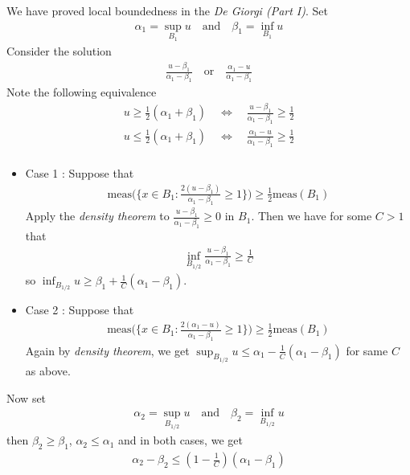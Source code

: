 \documentclass[12pt,a4paper]{article}
\newenvironment{proof}
{\begin{changemargin}{0.5cm}{0.5cm} 
	}%
	{\end{changemargin}
}
\newenvironment{p}
{\begin{proof} 
	}%
	{\end{proof}
}
\begin{document}
\begin{p}
\pf We have proved local boundedness in the \emph{De Giorgi (Part I)}. Set
\begin{align*}
\alpha_1 = \sup_{B_1}u \quad \text{and} \quad \beta_1 = \inf_{B_1} u
\end{align*}
Consider the solution
\begin{align*}
\frac{u-\beta_1}{\alpha_1 - \beta_1} \quad \text{or} \quad \frac{\alpha_1-u}{\alpha_1 -\beta_1}
\end{align*}
Note the following equivalence
\begin{align*}
u\geq \frac{1}{2}(\alpha_1 + \beta_1) \quad \Leftrightarrow \quad \frac{u-\beta_1}{\alpha_1 -\beta_1} \geq \frac{1}{2} \\
u\leq \frac{1}{2}(\alpha_1 + \beta_1) \quad \Leftrightarrow \quad \frac{\alpha_1-u}{\alpha_1 -\beta_1} \geq \frac{1}{2} \\
\end{align*}
\begin{itemize}
\item Case 1 : Suppose that
\begin{align*}
\text{meas}\Big(\Big\{ x\in B_1 : \frac{2(u-\beta_1)}{\alpha_1 -\beta_1} \geq 1 \Big\} \Big) \geq\frac{1}{2}\text{meas}(B_1)
\end{align*}
Apply the \emph{density theorem} to $\frac{u- \beta_1}{\alpha_1 -\beta_1} \geq 0$ in $B_1$. Then we have for some $C>1$ that
\begin{align*}
\inf_{B_{1/2}}\frac{u-\beta_1}{\alpha_1 -\beta_1} \geq \frac{1}{C}
\end{align*}
so $\inf_{B_{1/2}} u \geq \beta_1 + \frac{1}{C}(\alpha_1-\beta_1)$.
\item Case 2 : Suppose that
\begin{align*}
\text{meas}\Big(\Big\{ x\in B_1 : \frac{2(\alpha_1 -u)}{\alpha_1 -\beta_1} \geq 1 \Big\} \Big) \geq\frac{1}{2}\text{meas}(B_1)
\end{align*}
Again by \emph{density theorem}, we get $\sup_{B_{1/2}} u\leq \alpha_1 -\frac{1}{C}(\alpha_1 -\beta_1)$ for same $C$ as above. 
\end{itemize}
Now set
\begin{align*}
\alpha_2 = \sup_{B_{1/2}} u \quad \text{and} \quad \beta_2 =\inf_{B_{1/2}} u
\end{align*} 
then $\beta_2 \geq \beta_1$, $\alpha_2 \leq \alpha_1$ and in both cases, we get
\begin{align*}
\alpha_2 -\beta_2 \leq (1-\frac{1}{C})(\alpha_1 -\beta_1)
\end{align*}
\eop
\end{p}
\s
\end{document}
